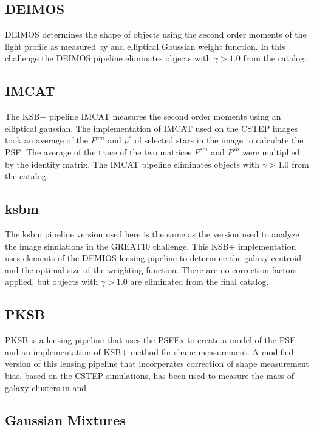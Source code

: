 \newpage 
\subsection{DEIMOS}
DEIMOS determines the shape of objects using the second
order moments of the light profile as measured by and elliptical
Gaussian weight function. In this challenge the DEIMOS pipeline eliminates objects with $ \gamma > 1.0 $
from the catalog. \\
 
\subsection{IMCAT}
The KSB+ pipeline IMCAT measures the second order moments using an
elliptical gaussian. The implementation of IMCAT used on the CSTEP images
took an average of the $P^{sm}$ and $p^*$ of selected stars in the
image to calculate the PSF. The average of the trace of the two
matrices $P^{sm}$ and $P^{sh}$ were multiplied by the identity
matrix. The IMCAT pipeline eliminates objects with $ \gamma > 1.0 $
from the catalog.  \\

\subsection{ksbm}
The ksbm pipeline version used here is the same as the version
used to analyze the image sinulations in the GREAT10 challenge. This
KSB+ implementation uses elements of the 
DEMIOS lensing pipeline to determine the galaxy centroid and the
optimal size of the weighting function. There are no correction
factors applied, but objects with $\gamma > 1.0 $ are eliminated from
the final catalog. \\

\subsection{PKSB}
PKSB is a lensing pipeline that uses the PSFEx \cite{PSFex}
to create a model of the PSF and an implementation of KSB+ method 
for shape measurement. A modified version of this lensing pipeline
that incorperates correction of shape measurement bias, based on the
CSTEP simulations, has been used to measure the mass of galaxy
clusters in \cite{Gruen_s} and \cite{Gruen2}. \\
 
\subsection{Gaussian Mixtures}

